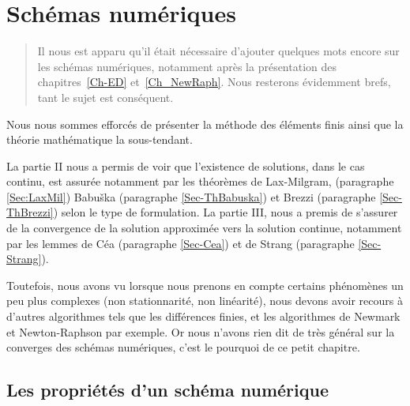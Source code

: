 \chapter{Schémas numériques}\label{Ch-shemanum}
\begin{abstract}
Il nous est apparu qu'il était nécessaire d'ajouter quelques mots encore sur les schémas numériques,
notamment après la présentation des chapitres~\ref{Ch-ED} et~\ref{Ch_NewRaph}. Nous resterons
évidemment brefs, tant le sujet est conséquent.
\end{abstract}


\medskip
Nous nous sommes efforcés de présenter la méthode des éléments finis ainsi que la théorie mathématique la
sous-tendant.

La partie II nous a permis de voir que l'existence de solutions, dans le cas continu, est assurée notamment par
les théorèmes de Lax-Milgram,
(paragraphe \ref{Sec:LaxMil}) Babuška (paragraphe \ref{Sec-ThBabuska}) et
Brezzi\label{Sec:Brezzi} (paragraphe \ref{Sec-ThBrezzi}) selon le type de formulation.
La partie III, nous a premis de s'assurer de la convergence de la solution approximée vers la solution continue, notamment par les
lemmes de Céa (paragraphe \ref{Sec-Cea}) et de
Strang (paragraphe \ref{Sec-Strang}).

Toutefois, nous avons vu lorsque nous prenons en compte certains phénomènes un peu plus complexes (non stationnarité, non linéarité),
nous devons avoir recours à d'autres algorithmes tels que les différences finies, et les algorithmes de Newmark et Newton-Raphson par
exemple. Or nous n'avons rien dit de très général sur la converges des schémas numériques, c'est le pourquoi de ce petit chapitre.


\medskip
\section{Les propriétés d'un schéma numérique}


\medskip
